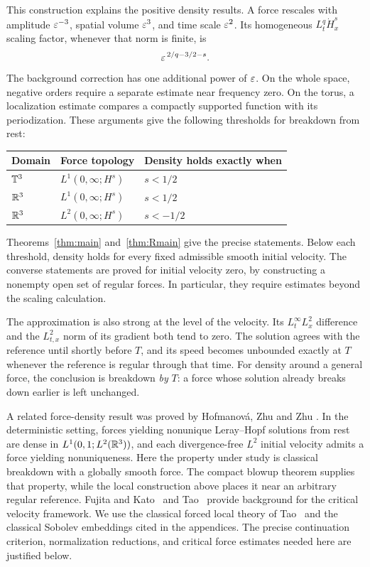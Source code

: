 This construction explains the positive density results. A force rescales
with amplitude $\varepsilon^{-3}$, spatial volume $\varepsilon^3$, and time scale
$\varepsilon^2$. Its homogeneous $L^q_t\dot H^s_x$ scaling factor, whenever that
norm is finite, is
\[
 \varepsilon^{\,2/q-3/2-s}.
\]
The background correction has one additional power of $\varepsilon$. On the
whole space, negative orders require a separate estimate near frequency
zero. On the torus, a localization estimate compares a compactly supported
function with its periodization. These arguments give the following
thresholds for breakdown from rest:
\begin{center}
\begin{tabular}{lll}
\toprule
Domain & Force topology & Density holds exactly when\\
\midrule
$\mathbb T^3$ & $L^1(0,\infty;H^s)$ & $s<1/2$\\
$\mathbb R^3$ & $L^1(0,\infty;H^s)$ & $s<1/2$\\
$\mathbb R^3$ & $L^2(0,\infty;H^s)$ & $s<-1/2$\\
\bottomrule
\end{tabular}
\end{center}
Theorems~\ref{thm:main} and~\ref{thm:Rmain} give the precise statements.
Below each threshold, density holds for every fixed admissible smooth
initial velocity. The converse statements are proved for initial velocity
zero, by constructing a nonempty open set of regular forces. In particular,
they require estimates beyond the scaling calculation.

The approximation is also strong at the level of the velocity. Its
$L^\infty_tL^2_x$ difference and the $L^2_{t,x}$ norm of its gradient both
tend to zero. The solution agrees with the reference until shortly before
$T$, and its speed becomes unbounded exactly at $T$ whenever the reference
is regular through that time. For density around a general force, the
conclusion is breakdown \emph{by} $T$: a force whose solution already
breaks down earlier is left unchanged.

A related force-density result was proved by Hofmanov\'a, Zhu and Zhu
\cite[Theorem~1.4, Corollary~4.6, and Theorem~5.1]{hzz2024}. In the
deterministic setting, forces yielding nonunique Leray--Hopf solutions
from rest are dense in $L^1(0,1;L^2(\mathbb R^3))$, and each divergence-free
$L^2$ initial velocity admits a force yielding nonuniqueness. Here the
property under study is classical breakdown with a globally smooth force.
The compact blowup theorem supplies that property, while the local
construction above places it near an arbitrary regular reference.
Fujita and Kato~\cite{fujita} and Tao~\cite{tao2018} provide background
for the critical velocity framework. We use the classical forced local
theory of Tao~\cite[Theorems~5.1 and~5.4]{tao2013} and the classical
Sobolev embeddings cited in the appendices. The precise continuation
criterion, normalization reductions, and critical force estimates needed
here are justified below.

